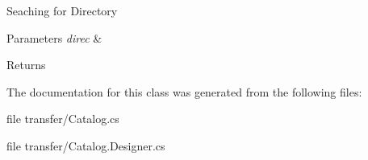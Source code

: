 Seaching for Directory 


\begin{DoxyParams}{Parameters}
{\em direc} & \\
\hline
\end{DoxyParams}
\begin{DoxyReturn}{Returns}

\end{DoxyReturn}


The documentation for this class was generated from the following files\+:\begin{DoxyCompactItemize}
\item 
file transfer/Catalog.\+cs\item 
file transfer/Catalog.\+Designer.\+cs\end{DoxyCompactItemize}
